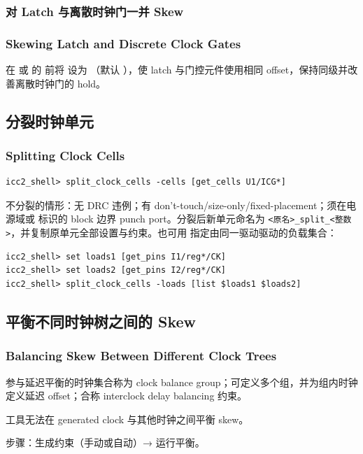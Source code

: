 \subsubsection{对 Latch 与离散时钟门一并 Skew}
\subsubsection*{Skewing Latch and Discrete Clock Gates}

在  或  的  前将  设为 （默认 ），使 latch 与门控元件使用相同 offset，保持同级并改善离散时钟门的 hold。

\subsection{分裂时钟单元}
\subsubsection*{Splitting Clock Cells}

\begin{lstlisting}
icc2_shell> split_clock_cells -cells [get_cells U1/ICG*]
\end{lstlisting}
不分裂的情形：无 DRC 违例；有 don't-touch/size-only/fixed-placement；须在电源域或  标识的 block 边界 punch port。分裂后新单元命名为 \texttt{<原名>\_split\_<整数>}，并复制原单元全部设置与约束。也可用  指定由同一驱动驱动的负载集合：
\begin{lstlisting}
icc2_shell> set loads1 [get_pins I1/reg*/CK]
icc2_shell> set loads2 [get_pins I2/reg*/CK]
icc2_shell> split_clock_cells -loads [list $loads1 $loads2]
\end{lstlisting}

\subsection{平衡不同时钟树之间的 Skew}
\subsubsection*{Balancing Skew Between Different Clock Trees}

参与延迟平衡的时钟集合称为 clock balance group；可定义多个组，并为组内时钟定义延迟 offset；合称 interclock delay balancing 约束。
\begin{noteBox}
工具无法在 generated clock 与其他时钟之间平衡 skew。
\end{noteBox}
步骤：生成约束（手动或自动）→ 运行平衡。

